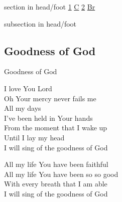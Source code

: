 \documentclass{beamer}
\begin{document}
{
{ 
 {
 \begin{beamercolorbox}[ht=4.5ex,dp=1.5ex,%
      leftskip=.3cm,rightskip=.3cm plus1fil]{section in head/foot}
 \fontsize{12}{25}\selectfont 
\hyperlink{Goodness of God['All my life You have been faithful']1}{1}
\hyperlink{Goodness of God['All my life You have been faithful']C}{C}
\hyperlink{Goodness of God['All my life You have been faithful']2}{2}
\hyperlink{Goodness of God['All my life You have been faithful']Br}{Br}
 
 \end{beamercolorbox}%
  \begin{beamercolorbox}[ht=2.5ex,dp=1.125ex,%
   leftskip=.3cm,rightskip=.3cm plus1fil]{subsection in head/foot}
   \insertauthor
 \end{beamercolorbox}%
 }
}
\subsection{ Goodness of God }

\hypertarget{Goodness of God['All my life You have been faithful']1}{}
\begin{frame}{Goodness of God }
\fontsize{ 20 }{ 27 }\selectfont

I love You Lord\\ 
Oh Your mercy never fails me\\ 
All my days\\ 
I've been held in Your hands\\ 
From the moment that I wake up\\ 
Until I lay my head\\ 
I will sing of the goodness of God 

\end{frame}

\hypertarget{Goodness of God['All my life You have been faithful']C}{}
\begin{frame}{}
\fontsize{ 20 }{ 27 }\selectfont

All my life You have been faithful\\ 
All my life You have been so so good\\ 
With every breath that I am able\\ 
I will sing of the goodness of God 

\end{frame}

\hypertarget{Goodness of God['All my life You have been faithful']2}{}
\begin{frame}{}
\fontsize{ 20 }{ 27 }\selectfont


\end{frame}}
\end{document}
